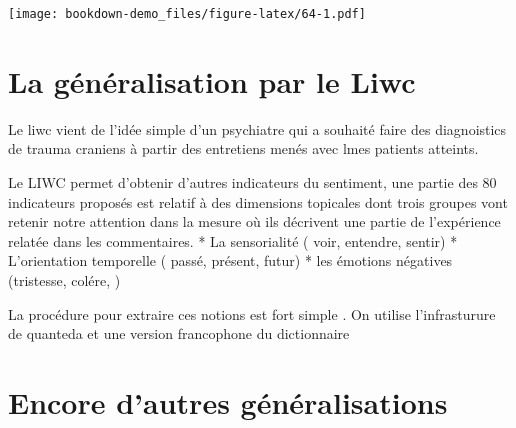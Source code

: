 \documentclass[
]{book}
\newenvironment{Shaded}{\begin{snugshade}}{\end{snugshade}}
\newcommand{\CommentTok}[1]{\textcolor[rgb]{0.56,0.35,0.01}{\textit{#1}}}
\newcommand{\DataTypeTok}[1]{\textcolor[rgb]{0.13,0.29,0.53}{#1}}
\newcommand{\KeywordTok}[1]{\textcolor[rgb]{0.13,0.29,0.53}{\textbf{#1}}}
\newcommand{\NormalTok}[1]{#1}
\newcommand{\OperatorTok}[1]{\textcolor[rgb]{0.81,0.36,0.00}{\textbf{#1}}}
\newcommand{\StringTok}[1]{\textcolor[rgb]{0.31,0.60,0.02}{#1}}
\begin{document}
\texttt{[image: bookdown-demo\_files/figure-latex/64-1.pdf]}

\hypertarget{la-guxe9nuxe9ralisation-par-le-liwc}{%
\section{La généralisation par le Liwc}\label{la-guxe9nuxe9ralisation-par-le-liwc}}

Le liwc vient de l'idée simple d'un psychiatre qui a souhaité faire des diagnoistics de trauma craniens à partir des entretiens menés avec lmes patients atteints. \citep{tausczik_psychological_2010}

Le LIWC permet d'obtenir d'autres indicateurs du sentiment, une partie des 80 indicateurs proposés est relatif à des dimensions topicales dont trois groupes vont retenir notre attention dans la mesure où ils décrivent une partie de l'expérience relatée dans les commentaires.
* La sensorialité ( voir, entendre, sentir)
* L'orientation temporelle ( passé, présent, futur)
* les émotions négatives (tristesse, colére, )

La procédure pour extraire ces notions est fort simple . On utilise l'infrasturure de quanteda et une version francophone du dictionnaire \citep{piolat_version_2011}

\begin{Shaded}
\end{Shaded}

\hypertarget{encore-dautres-guxe9nuxe9ralisations}{%
\section{Encore d'autres généralisations}\label{encore-dautres-guxe9nuxe9ralisations}}
\end{document}
